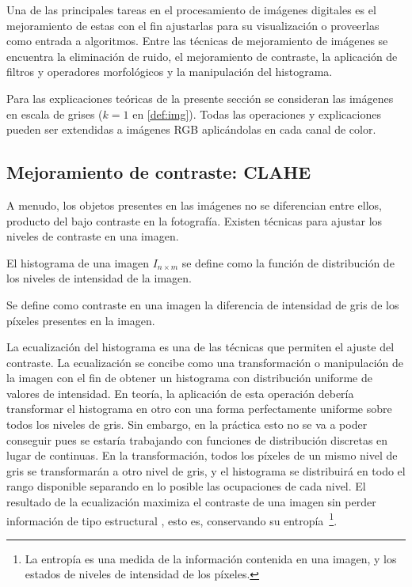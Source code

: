 Una de las principales tareas en el procesamiento de imágenes digitales es el mejoramiento de estas con el fin ajustarlas para su visualización o proveerlas como entrada a algoritmos. Entre las técnicas de mejoramiento de imágenes se encuentra la eliminación de ruido, el mejoramiento de contraste, la aplicación de filtros y operadores morfológicos y la manipulación del histograma.

Para las explicaciones teóricas de la presente sección se consideran las imágenes en escala de grises ($k=1$ en \ref{def:img}). Todas las operaciones y explicaciones pueden ser extendidas a imágenes RGB aplicándolas en cada canal de color.

\subsection{Mejoramiento de contraste: CLAHE}

A menudo, los objetos presentes en las imágenes no se diferencian entre ellos, producto del bajo contraste en la fotografía. Existen técnicas para ajustar los niveles de contraste en una imagen.

\begin{definition}
	El histograma de una imagen $I_{n \times m}$ se define como la función de distribución de los niveles de intensidad de la imagen.
\end{definition}

\begin{definition}
	Se define como contraste en una imagen la diferencia de intensidad de gris de los píxeles presentes en la imagen.
\end{definition}

La ecualización del histograma es una de las técnicas que permiten el ajuste del contraste. La ecualización se concibe como una transformación o manipulación de la imagen con el fin de obtener un histograma con distribución uniforme de valores de intensidad. En teoría, la aplicación de esta operación debería transformar el histograma en otro con una forma perfectamente uniforme sobre todos los niveles de gris. Sin embargo, en la práctica esto no se va a poder conseguir pues se estaría trabajando con funciones de distribución discretas en lugar de continuas. En la transformación, todos los píxeles de un mismo nivel de gris se transformarán a otro nivel de gris, y el histograma se distribuirá en todo el rango disponible separando en lo posible las ocupaciones de cada nivel. El resultado de la ecualización maximiza el contraste de una imagen sin perder información de tipo estructural \cite{solomon2011fundamentals}, esto es, conservando su entropía~\footnote{La entropía es una medida de la información contenida en una imagen, y los estados de niveles de intensidad de los píxeles.}.

